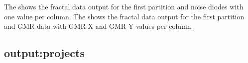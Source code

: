 The  shows the fractal data output for the
first partition and noise diodes with one value per column.
The  shows the fractal data output for the
first partition and GMR data with GMR-X and GMR-Y values per column.

\subsection{output:projects}

